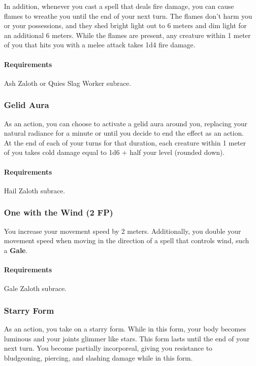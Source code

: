         In addition, whenever you cast a spell that deals fire damage, you can cause flames to wreathe you until the end of your next turn.
        The flames don't harm you or your possessions, and they shed bright light out to 6 meters and dim light for an additional 6 meters.
        While the flames are present, any creature within 1 meter of you that hits you with a melee attack takes 1d4 fire damage.
        \paragraph{Requirements} Ash Zaloth or Quies Slag Worker subrace.
    \subsubsection{Gelid Aura} \label{feat::gelidaura}
        As an action, you can choose to activate a gelid aura around you, replacing your natural radiance for a minute or until you decide to end the effect as an action.
        At the end of each of your turns for that duration, each creature within 1 meter of you takes cold damage equal to 1d6 + half your level (rounded down).
        \paragraph{Requirements} Hail Zaloth subrace.
    \subsubsection{One with the Wind (2 FP)} \label{feat::onewiththewind}
        You increase your movement speed by 2 meters.
        Additionally, you double your movement speed when moving in the direction of a spell that controls wind, such a \textbf{Gale}.
        \paragraph{Requirements} Gale Zaloth subrace.
    \subsubsection{Starry Form} \label{feat::starryform}
        As an action, you take on a starry form.
        While in this form, your body becomes luminous and your joints glimmer like stars.
        This form lasts until the end of your next turn.
        You become partially incorporeal, giving you resistance to bludgeoning, piercing, and slashing damage while in this form.

